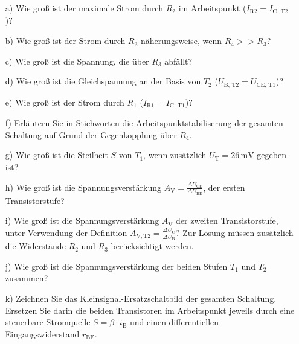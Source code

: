 {  \begin{itemize}
    \item[a)]
          Wie groß ist der maximale Strom durch $R_2$ im Arbeitspunkt ($I_\mathrm{R2}=I_\mathrm{C,\,T2}$)?
    \item[b)]
          Wie groß ist der Strom durch $R_3$ näherungsweise, wenn $R_4 >> R_3$?
    \item[c)]
          Wie groß ist die Spannung, die über $R_3$ abfällt?
    \item[d)]
          Wie groß ist die Gleichspannung an der Basis von $T_2$ ($U_\mathrm{B,\,T2}=U_\mathrm{CE,\,T1}$)?
    \item[e)]
          Wie groß ist der Strom durch $R_1$ ($I_\mathrm{R1}=I_\mathrm{C,\,T1}$)?
    \item[f)]
          Erläutern Sie in Stichworten die Arbeitspunktstabiliserung der gesamten Schaltung auf Grund der Gegenkopplung über $R_4$.
    \item[g)]
          Wie groß ist die Steilheit $S$ von $T_\mathrm{1}$, wenn zusätzlich $U_\mathrm{T} = 26\, \mathrm{mV}$ gegeben ist?
    \item[h)]
          Wie groß ist die Spannungsverstärkung $A_\mathrm{V} = \frac{\Delta U_\mathrm{CE}}{\Delta U_\mathrm{BE}}$, der ersten Transistorstufe?
    \item[i)]
          Wie groß ist die Spannungsverstärkung $A_\mathrm{V}$ der zweiten Transistorstufe, unter Verwendung der Definition $A_\mathrm{V,T2}=\frac{\Delta U_\mathrm{C}}{\Delta U_\mathrm{B}}$?
          Zur Lösung müssen zusätzlich die Widerstände $R_2$ und $R_3$ berücksichtigt werden.
    \item[j)]
          Wie groß ist die Spannungsverstärkung der beiden Stufen $T_\mathrm{1}$ und $T_\mathrm{2}$ zusammen?
    \item[k)]
          Zeichnen Sie das Kleinsignal-Ersatzschaltbild der gesamten Schaltung. Ersetzen Sie darin die beiden Transistoren im Arbeitspunkt jeweils durch eine steuerbare Stromquelle $S=\beta\cdot i_\mathrm{B}$ und einen differentiellen Eingangswiderstand $r_\mathrm{BE}$.
  \end{itemize}
}



